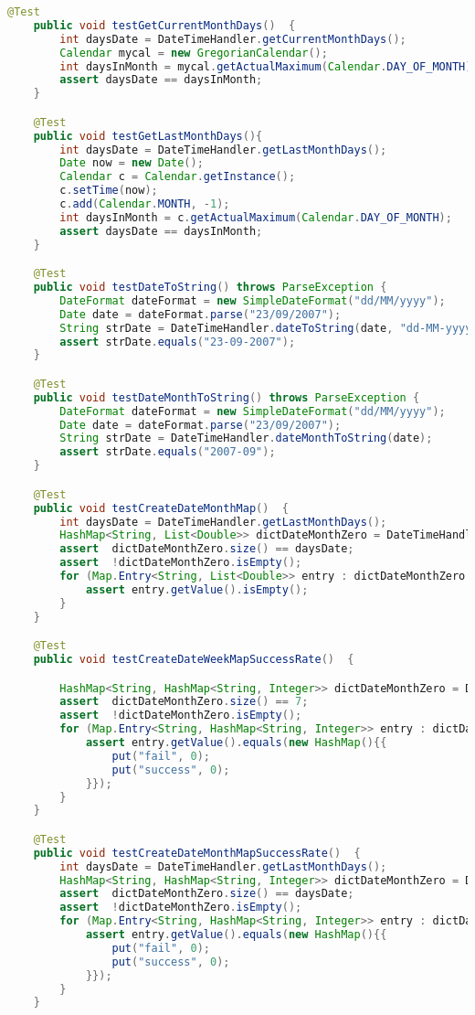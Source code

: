 \begin{lstlisting}[language=Java]
    @Test
    public void testGetCurrentMonthDays()  {
        int daysDate = DateTimeHandler.getCurrentMonthDays();
        Calendar mycal = new GregorianCalendar();
        int daysInMonth = mycal.getActualMaximum(Calendar.DAY_OF_MONTH);
        assert daysDate == daysInMonth;
    }

    @Test
    public void testGetLastMonthDays(){
        int daysDate = DateTimeHandler.getLastMonthDays();
        Date now = new Date();
        Calendar c = Calendar.getInstance();
        c.setTime(now);
        c.add(Calendar.MONTH, -1);
        int daysInMonth = c.getActualMaximum(Calendar.DAY_OF_MONTH);
        assert daysDate == daysInMonth;
    }

    @Test
    public void testDateToString() throws ParseException {
        DateFormat dateFormat = new SimpleDateFormat("dd/MM/yyyy");
        Date date = dateFormat.parse("23/09/2007");
        String strDate = DateTimeHandler.dateToString(date, "dd-MM-yyyy");
        assert strDate.equals("23-09-2007");
    }

    @Test
    public void testDateMonthToString() throws ParseException {
        DateFormat dateFormat = new SimpleDateFormat("dd/MM/yyyy");
        Date date = dateFormat.parse("23/09/2007");
        String strDate = DateTimeHandler.dateMonthToString(date);
        assert strDate.equals("2007-09");
    }

    @Test
    public void testCreateDateMonthMap()  {
        int daysDate = DateTimeHandler.getLastMonthDays();
        HashMap<String, List<Double>> dictDateMonthZero = DateTimeHandler.createDateMonthMap();
        assert  dictDateMonthZero.size() == daysDate;
        assert  !dictDateMonthZero.isEmpty();
        for (Map.Entry<String, List<Double>> entry : dictDateMonthZero.entrySet()) {
            assert entry.getValue().isEmpty();
        }
    }

    @Test
    public void testCreateDateWeekMapSuccessRate()  {

        HashMap<String, HashMap<String, Integer>> dictDateMonthZero = DateTimeHandler.createDateWeekMapSuccessRate();
        assert  dictDateMonthZero.size() == 7;
        assert  !dictDateMonthZero.isEmpty();
        for (Map.Entry<String, HashMap<String, Integer>> entry : dictDateMonthZero.entrySet()) {
            assert entry.getValue().equals(new HashMap(){{
                put("fail", 0);
                put("success", 0);
            }});
        }
    }

    @Test
    public void testCreateDateMonthMapSuccessRate()  {
        int daysDate = DateTimeHandler.getLastMonthDays();
        HashMap<String, HashMap<String, Integer>> dictDateMonthZero = DateTimeHandler.createDateMonthMapSuccessRate();
        assert  dictDateMonthZero.size() == daysDate;
        assert  !dictDateMonthZero.isEmpty();
        for (Map.Entry<String, HashMap<String, Integer>> entry : dictDateMonthZero.entrySet()) {
            assert entry.getValue().equals(new HashMap(){{
                put("fail", 0);
                put("success", 0);
            }});
        }
    }


\end{lstlisting}
